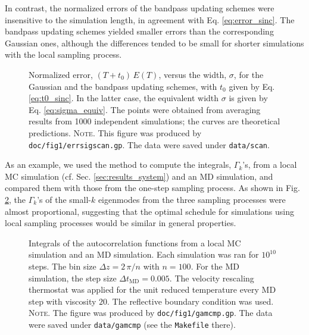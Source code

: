\documentclass[reprint, floatfix]{revtex4-1}
\newcommand{\note}[1]{{\color{DarkGreen}\footnotesize \textsc{Note.} #1}}
\newcommand{\Err}{E}
\begin{document}
In contrast,
the normalized errors of the bandpass updating schemes
were insensitive to the simulation length,
in agreement with Eq. \eqref{eq:error_sinc}.
%
The bandpass updating schemes
yielded smaller errors than
the corresponding Gaussian ones,
although the differences tended to
be small for shorter simulations
with the local sampling process.



\begin{figure}[h]
\begin{center}
  \caption{
    \label{fig:errsigscan}
    Normalized error, $(T + t_0) \, \Err(T)$,
    versus the width, $\sigma$,
    for the Gaussian
    and the bandpass updating schemes,
    with $t_0$ given by Eq. \eqref{eq:t0_sinc}.
    In the latter case,
    the equivalent width
    $\sigma$ is given by Eq. \eqref{eq:sigma_equiv}.
    The points were obtained from averaging results
    from 1000 independent simulations;
    the curves are theoretical predictions.
    \note{This figure was produced by
      \texttt{doc/fig1/errsigscan.gp}.
      The data were saved under
      \texttt{data/scan}.
    }%
  }
\end{center}
\end{figure}



As an example, we used the method to compute
the integrals, $\Gamma_k$'s, from
a local MC simulation
(cf. Sec. \ref{sec:results_system})
and an MD simulation,
and compared them with those from
the one-step sampling process.
%
As shown in Fig. \ref{fig:gamcmp},
the $\Gamma_k$'s of the small-$k$ eigenmodes
from the three sampling processes
were almost proportional,
suggesting that
the optimal schedule
for simulations using local sampling processes
would be similar in general properties.



\begin{figure}[h]
\begin{center}
  \caption{
    \label{fig:gamcmp}
    Integrals of the autocorrelation functions
    from a local MC simulation
    and an MD simulation.
    Each simulation was ran for $10^{10}$ steps.
    The bin size $\Delta z = 2\, \pi /n$ with $n = 100$.
    For the MD simulation,
    the step size $\Delta t_\mathrm{MD} = 0.005$.
    The velocity rescaling thermostat\cite{bussi2007} was
    applied for the unit reduced temperature
    every MD step with viscosity $20$.
    The reflective boundary condition was used.
    \note{The figure was produced by \texttt{doc/fig1/gamcmp.gp}.
      The data were saved under \texttt{data/gamcmp}
      (see the \texttt{Makefile} there).
    }%
  }
\end{center}
\end{figure}
\end{document}
